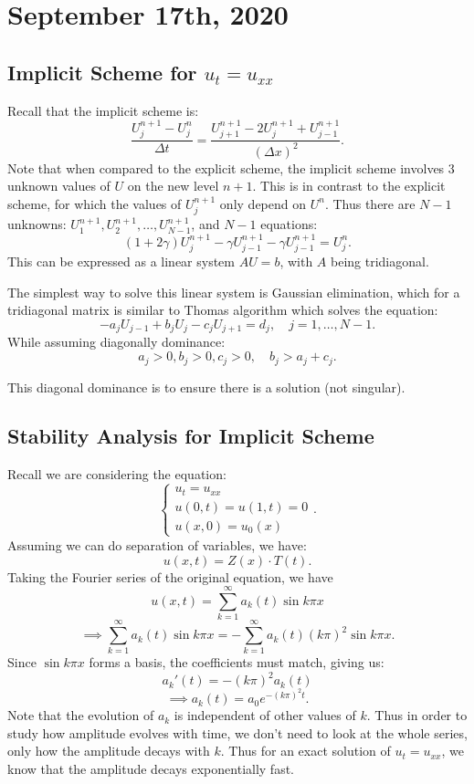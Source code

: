 \documentclass[../main/main.tex]{subfiles}
\begin{document}
\section{September 17th, 2020}
\subsection{Implicit Scheme for $u_t = u_{xx}$}
Recall that the implicit scheme is: \[
    \frac{U_j^{n+1}-U^n_j}{\Delta t} = \frac{U^{n+1}_{j+1}-2U^{n+1}_j + U^{n+1}_{j-1}}{(\Delta x)^2}
.\] Note that when compared to the explicit scheme, the implicit scheme involves 3 unknown values of $U$ on the new level  $n+1$. This is in contrast to the explicit scheme, for which the values of  $U^{n+1}_j$ only depend on $U^{n}$. Thus there are $N-1$ unknowns:  $U^{n+1}_1, U^{n+1}_2,\ldots,U^{n+1}_{N-1}$, and $N-1$ equations:  \[
    (1+2\gamma) U_j^{n+1} - \gamma U^{n+1}_{j-1} - \gamma U^{n+1}_{j-1} = U^{n}_j
.\] This can be expressed as a linear system $AU=b$, with  $A$ being tridiagonal. 


The simplest way to solve this linear system is Gaussian elimination, which for a tridiagonal matrix is similar to Thomas algorithm which solves the equation:  \[
-a_j U_{j-1} + b_j U_{j} - c_jU_{j+1} = d_j, \quad j = 1,\ldots,N-1
.\] While assuming diagonally dominance: \[
a_j >  0, b_j >  0, c_j > 0, \quad b_j > a_j + c_j
.\]
\begin{remark}
    This diagonal dominance is to ensure there is a solution (not singular).
\end{remark}

\subsection{Stability Analysis for Implicit Scheme }
Recall we are considering the equation: \[
\begin{cases}
    u_t = u_{x x} \\
    u(0,t) = u(1,t) = 0 \\
    u(x,0) = u_0(x)
\end{cases}
.\] Assuming we can do separation of variables, we have: \[
u(x,t) = Z(x) \cdot  T(t)
.\] Taking the Fourier series of the original equation, we have\[
u(x,t) = \sum_{k=1}^{\infty} a_k(t) \sin k\pi x
\] \[
\implies \sum_{k=1}^{\infty} a_k(t) \sin k\pi x = -\sum_{k=1}^{\infty} a_k(t)(k\pi)^2 \sin k\pi x
.\] Since $\sin k\pi x$ forms a basis, the coefficients must match, giving us: \[
a_k'(t) = -(k\pi)^2a_k(t)
\] \[
\implies a_k(t) = a_0 e^{-(k\pi)^2t}
.\] 
Note that the evolution of $a_k$ is independent of other values of  $k$. Thus in order to study how amplitude evolves with time, we don't need to look at the whole series, only how the amplitude decays with $k$. Thus for an exact solution of $u_t = u_{x x}$, we know that the amplitude decays exponentially fast. 
\end{document}

